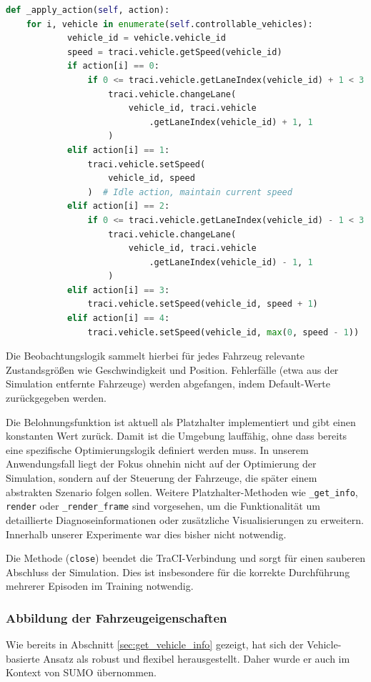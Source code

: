 \begin{lstlisting}[language=Python, caption=apply\_action Implementierung, label={lst:applyAction}]
def _apply_action(self, action):
    for i, vehicle in enumerate(self.controllable_vehicles):
            vehicle_id = vehicle.vehicle_id
            speed = traci.vehicle.getSpeed(vehicle_id)
            if action[i] == 0:
                if 0 <= traci.vehicle.getLaneIndex(vehicle_id) + 1 < 3:
                    traci.vehicle.changeLane(
                        vehicle_id, traci.vehicle
                            .getLaneIndex(vehicle_id) + 1, 1
                    )
            elif action[i] == 1:
                traci.vehicle.setSpeed(
                    vehicle_id, speed
                )  # Idle action, maintain current speed
            elif action[i] == 2:
                if 0 <= traci.vehicle.getLaneIndex(vehicle_id) - 1 < 3:
                    traci.vehicle.changeLane(
                        vehicle_id, traci.vehicle
                            .getLaneIndex(vehicle_id) - 1, 1
                    )
            elif action[i] == 3:
                traci.vehicle.setSpeed(vehicle_id, speed + 1)
            elif action[i] == 4:
                traci.vehicle.setSpeed(vehicle_id, max(0, speed - 1))
\end{lstlisting}
Die Beobachtungslogik sammelt hierbei für jedes Fahrzeug relevante Zustandsgrößen wie Geschwindigkeit und Position. Fehlerfälle (etwa aus der Simulation entfernte Fahrzeuge) werden abgefangen, indem Default-Werte zurückgegeben werden.

Die Belohnungsfunktion ist aktuell als Platzhalter implementiert und gibt einen konstanten Wert zurück. Damit ist die Umgebung lauffähig, ohne dass bereits eine spezifische Optimierungslogik definiert werden muss. In unserem Anwendungsfall liegt der Fokus ohnehin nicht auf der Optimierung der Simulation, sondern auf der Steuerung der Fahrzeuge, die später einem abstrakten Szenario folgen sollen. Weitere Platzhalter-Methoden wie \texttt{\_get\_info}, \texttt{render} oder \texttt{\_render\_frame} sind vorgesehen, um die Funktionalität um detaillierte Diagnoseinformationen oder zusätzliche Visualisierungen zu erweitern. Innerhalb unserer Experimente war dies bisher nicht notwendig.

Die Methode (\texttt{close}) beendet die TraCI-Verbindung und sorgt für einen sauberen Abschluss der Simulation. Dies ist insbesondere für die korrekte Durchführung mehrerer Episoden im Training notwendig.
\subsubsection{Abbildung der Fahrzeugeigenschaften}
Wie bereits in Abschnitt \ref{sec:get_vehicle_info} gezeigt, hat sich der Vehicle-basierte Ansatz als robust und flexibel herausgestellt. Daher wurde er auch im Kontext von SUMO übernommen.

